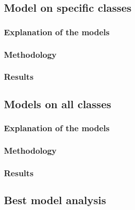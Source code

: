 

\subsection{Model on specific classes}

\subsubsection{Explanation of the models}
\subsubsection{Methodology}
\subsubsection{Results}

\subsection{Models on all classes}
\subsubsection{Explanation of the models}
\subsubsection{Methodology}
\subsubsection{Results}

\subsection{Best model analysis}

